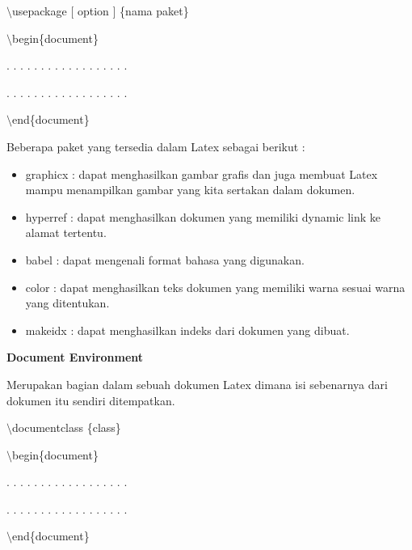 $\setminus$usepackage $[$ option $]$ \{nama paket\}\par \vspace{12pt}

$\setminus$begin\{document\}\par \vspace{12pt}

. . . . . . . . . . . . . . . . . .

. . . . . . . . . . . . . . . . . .
\par \vspace{12pt}
$\setminus$end\{document\}\par \vspace{12pt}

Beberapa paket yang tersedia dalam Latex sebagai berikut :

\begin{itemize}
\item graphicx : dapat menghasilkan gambar grafis dan juga membuat Latex mampu menampilkan gambar yang kita sertakan dalam dokumen.
\item hyperref : dapat menghasilkan dokumen yang memiliki dynamic link ke alamat tertentu.
\item babel : dapat mengenali format bahasa yang digunakan.
\item color : dapat menghasilkan teks dokumen yang memiliki warna sesuai warna yang ditentukan.
\item makeidx : dapat menghasilkan indeks dari dokumen yang dibuat.
\end{itemize}
\textbf{Document Environment}\par \vspace{12pt}

Merupakan bagian dalam sebuah dokumen Latex dimana isi sebenarnya dari dokumen itu sendiri ditempatkan.
\par \vspace{12pt}
$\setminus$documentclass \{class\}\par \vspace{12pt}

$\setminus$begin\{document\}\par \vspace{12pt}

. . . . . . . . . . . . . . . . . .

. . . . . . . . . . . . . . . . . .\par \vspace{12pt}

$\setminus$end\{document\}\par \vspace{12pt}

